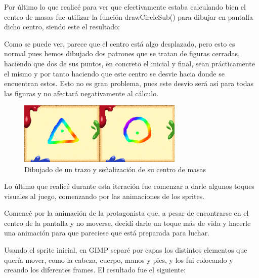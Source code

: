  \vspace{0.5cm}
 
 Por último lo que realicé para ver que efectivamente estaba calculando bien el centro de masas fue utilizar la función drawCircleSub() para dibujar en pantalla dicho centro, siendo este el resultado:
 
\vspace{0.5cm} 
 
 Como se puede ver, parece que el centro está algo desplazado, pero esto es normal pues hemos dibujado dos patrones que se tratan de figuras cerradas, haciendo que dos de sus puntos, en concreto el inicial y final, sean prácticamente el mismo y por tanto haciendo que este centro se desvie hacia donde se encuentran estos. Esto no es gran problema, pues este desvío será así para todas las figuras y no afectará negativamente al cálculo.
 
  \vspace{0.5cm}
  
\begin{figure}[htbp]
\centering
  \includegraphics[width=0.7\textwidth]{archivos/yes_center_of_mass.png}
  \caption{Dibujado de un trazo y señalización de su centro de masas}
  \label{fig:yes_center_of_mass}
\end{figure}
  
\vspace{0.5cm}
  
  Lo último que realicé durante esta iteración fue comenzar a darle algunos toques visuales al juego, comenzando por las animaciones de los sprites.
  
   \vspace{0.5cm}
  
  Comencé por la animación de la protagonista que, a pesar de encontrarse en el centro de la pantalla y no moverse, decidí darle un toque más de vida y hacerle una animación para que pareciese que está preparada para luchar.
  
   \vspace{0.5cm}
  
  Usando el sprite inicial, en GIMP separé por capas los distintos elementos que quería mover, como la cabeza, cuerpo, manos y pies, y los fui colocando y creando los diferentes frames. El resultado fue el siguiente:
  
